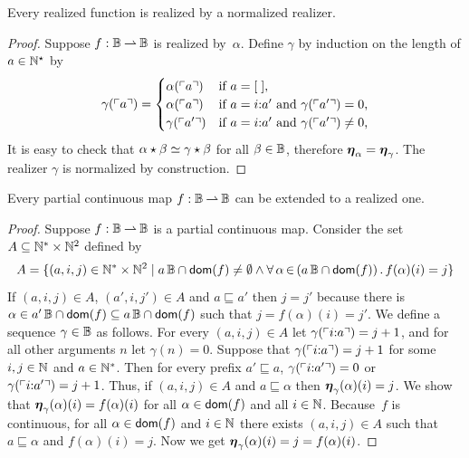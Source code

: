 \begin{lemma}
  \label{lemma:normalized-BB}%
  Every realized function is realized by a normalized realizer.
\end{lemma}

\begin{proof}
  Suppose $f : \mathbb{B} \mathbin{\rightharpoonup} \mathbb{B}$ is realized by~$\alpha$. Define
  $\gamma$ by induction on the length of $a \in \mathbb{N}^{\star}$ by
  \begin{equation*}
    \gamma(\ulcorner a \urcorner) =
    \begin{cases}
      \alpha(\ulcorner a \urcorner) & \text{if $a = [\;]$,}\\
      \alpha(\ulcorner a \urcorner) & \text{if $a = i {:} a'$ and
        $\gamma(\ulcorner a' \urcorner) = 0$,}\\
      \gamma(\ulcorner a' \urcorner) & \text{if $a = i {:} a'$ and
        $\gamma(\ulcorner a' \urcorner) \neq 0$,}
    \end{cases}
  \end{equation*}
  It is easy to check that $\alpha \star \beta \simeq \gamma \star
  \beta$ for all $\beta \in \mathbb{B}$, therefore $\text{\boldmath{$\eta$}}_\alpha =
  \text{\boldmath{$\eta$}}_\gamma$. The realizer $\gamma$ is normalized by construction.
\end{proof}


\begin{theorem}
  \label{th:extension_BB}%
  Every partial continuous map $f: \mathbb{B} \mathbin{\rightharpoonup} \mathbb{B}$ can be extended
  to a realized one.
\end{theorem}

\begin{proof}
  Suppose $f: \mathbb{B} \mathbin{\rightharpoonup} \mathbb{B}$ is a partial continuous map.  Consider
  the set $A \subseteq \mathbb{N}^{*} \times \mathbb{N}^2$ defined by
  \begin{equation*}
     A = \set{(a, i, j) \in \NN^{*} \times \NN^{2} \such
        \basicBB{a} \cap \dom{f} \neq \emptyset \land
        \xall{\alpha}{(\basicBB{a} \cap \dom{f})}{
          f(\alpha)(i) = j
          }
        }
  \end{equation*}
  If $(a, i, j) \in A$, $(a', i, j') \in A$ and $a \sqsubseteq a'$
  then $j = j'$ because there is $\alpha \in a'\,\mathbb{B} \cap
  \mathsf{dom}(f) \subseteq a\,\mathbb{B} \cap \mathsf{dom}(f)$ such that $j =
  f(\alpha)(i) = j'$. We define a sequence $\gamma \in \mathbb{B}$ as
  follows. For every $(a, i, j) \in A$ let
  $\gamma(\ulcorner i {:} a \urcorner) = j + 1$, and for all other
  arguments $n$ let $\gamma(n) = 0$. Suppose that
  $\gamma(\ulcorner i {:} a \urcorner) = j + 1$ for some $i, j \in \mathbb{N}$
  and $a \in \mathbb{N}^{*}$. Then for every prefix $a' \sqsubseteq a$,
  $\gamma(\ulcorner i {:} a' \urcorner) = 0$ or
  $\gamma(\ulcorner i {:} a' \urcorner) = j + 1$. Thus, if $(a, i, j) \in
  A$ and $a \sqsubseteq \alpha$ then $\text{\boldmath{$\eta$}}_{\gamma}(\alpha)(i) = j$.
  We show that $\text{\boldmath{$\eta$}}_{\gamma}(\alpha)(i) = f(\alpha)(i)$ for all
  $\alpha \in \mathsf{dom}(f)$ and all $i \in \mathbb{N}$. Because~$f$ is continuous,
  for all $\alpha \in \mathsf{dom}(f)$ and $i \in \mathbb{N}$ there exists $(a, i, j)
  \in A$ such that $a \sqsubseteq \alpha$ and $f(\alpha)(i) = j$. Now
  we get
  $
    \text{\boldmath{$\eta$}}_{\gamma}(\alpha)(i)
    = j
    = f(\alpha)(i)
  $.
\end{proof}

